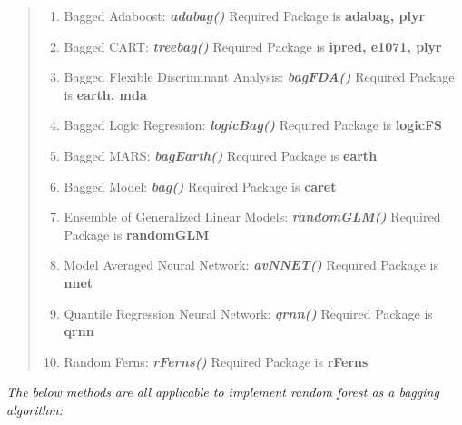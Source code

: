 \documentclass[11pt]{article}
\providecommand{\tightlist}{%
      \setlength{\itemsep}{0pt}\setlength{\parskip}{0pt}}
\begin{document}
\begin{quote}
\begin{enumerate}
\def\labelenumi{\arabic{enumi}.}
\tightlist
\item
  Bagged Adaboost: \textbf{\emph{adabag()}} Required Package is
  \textbf{adabag, plyr}
\item
  Bagged CART: \textbf{\emph{treebag()}} Required Package is
  \textbf{ipred, e1071, plyr}
\item
  Bagged Flexible Discriminant Analysis: \textbf{\emph{bagFDA()}}
  Required Package is \textbf{earth, mda}
\item
  Bagged Logic Regression: \textbf{\emph{logicBag()}} Required Package
  is \textbf{logicFS}
\item
  Bagged MARS: \textbf{\emph{bagEarth()}} Required Package is
  \textbf{earth}
\item
  Bagged Model: \textbf{\emph{bag()}} Required Package is \textbf{caret}
\item
  Ensemble of Generalized Linear Models: \textbf{\emph{randomGLM()}}
  Required Package is \textbf{randomGLM}
\item
  Model Averaged Neural Network: \textbf{\emph{avNNET()}} Required
  Package is \textbf{nnet}
\item
  Quantile Regression Neural Network: \textbf{\emph{qrnn()}} Required
  Package is \textbf{qrnn}
\item
  Random Ferns: \textbf{\emph{rFerns()}} Required Package is
  \textbf{rFerns}
\end{enumerate}
\end{quote}

\emph{The below methods are all applicable to implement random forest as
a bagging algorithm:}
\end{document}
